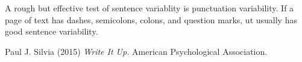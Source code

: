 \epigraph{A rough but effective test of sentence variablity is punctuation variability. If a page of text has dashes, semicolons, colons, and question marks, ut usually has good sentence variability.}{Paul J. Silvia (2015) \emph{Write It Up.} American Psychological Association.}

